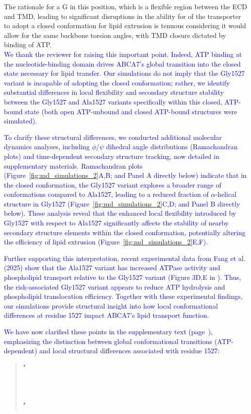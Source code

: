 The rationale for a G in this position, which is a flexible region between the ECD and TMD, leading to significant disruptions in the ability for of the transporter to adopt a closed conformation for lipid extrusion is tenuous considering it would allow for the same backbone torsion angles, with TMD closure dictated by binding of ATP.\\
\textcolor{blue}{We thank the reviewer for raising this important point. Indeed, ATP binding at the nucleotide-binding domain drives ABCA7’s global transition into the closed state necessary for lipid transfer. Our simulations do not imply that the Gly1527 variant is incapable of adopting the closed conformation; rather, we identify substantial differences in local flexibility and secondary structure stability between the Gly1527 and Ala1527 variants specifically within this closed, ATP-bound state (both open ATP-unbound and closed ATP-bound structures were simulated).} 

\textcolor{blue}{To clarify these structural differences, we conducted additional molecular dynamics analyses, including $\phi$/$\psi$ dihedral angle distributions (Ramachandran plots) and time-dependent secondary structure tracking, now detailed in supplementary materials. Ramachandran plots (Figure~\ref{fig:md_simulations_2}A,B; and Panel A directly below) indicate that in the closed conformation, the Gly1527 variant explores a broader range of conformations compared to Ala1527, leading to a reduced fraction of $\alpha$-helical structure in Gly1527  (Figure~\ref{fig:md_simulations_2}C,D; and Panel B directly below). These analysis reveal that the enhanced local flexibility introduced by Gly1527 with respect to Ala1527 significantly affects the stability of nearby secondary structure elements within the closed conformation, potentially altering the efficiency of lipid extrusion (Figure~\ref{fig:md_simulations_2}E,F).}

\textcolor{blue}{Further supporting this interpretation, recent experimental data from Fang et al. (2025) \cite{Fang2025} show that the Ala1527 variant has increased ATPase activity and phospholipid transport relative to the Gly1527 variant (Figure 3D,E in \cite{Fang2025}). Thus, the risk-associated Gly1527 variant appears to reduce ATP hydrolysis and phospholipid translocation efficiency. Together with these experimental findings, our simulations provide structural insight into how local conformational differences at residue 1527 impact ABCA7’s lipid transport function.}

\textcolor{blue}{We have now clarified these points in the supplementary text (page~\pageref{quoteM-label}), emphasizing the distinction between global conformational transitions (ATP-dependent) and local structural differences associated with residue 1527:}
\begin{quote}
	\textcolor{blue}{"}\quoteM\\\\
    \quoteN\\\\
    \quoteO\textcolor{blue}{"}
\end{quote}

